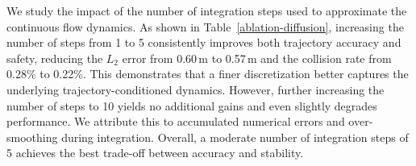 \begin{table}[t]
    \centering
    \setlength{\tabcolsep}{8pt} 
    \vspace{1mm}
    \caption{\textbf{Ablations on the Dynamic Latent World Model Design.}}
    \vspace{-8mm}
    \label{ablation-wm}
\end{table}



We study the impact of the number of integration steps used to approximate the continuous flow dynamics. 
As shown in Table~\ref{ablation-diffusion}, increasing the number of steps from 1 to 5 consistently improves both trajectory accuracy and safety, reducing the $L_2$ error from 0.60\,m to 0.57\,m and the collision rate from 0.28\% to 0.22\%. 
This demonstrates that a finer discretization better captures the underlying trajectory-conditioned dynamics.
However, further increasing the number of steps to 10 yields no additional gains and even slightly degrades performance. 
We attribute this to accumulated numerical errors and over-smoothing during integration. 
Overall, a moderate number of integration steps of 5 achieves the best trade-off between accuracy and stability.

